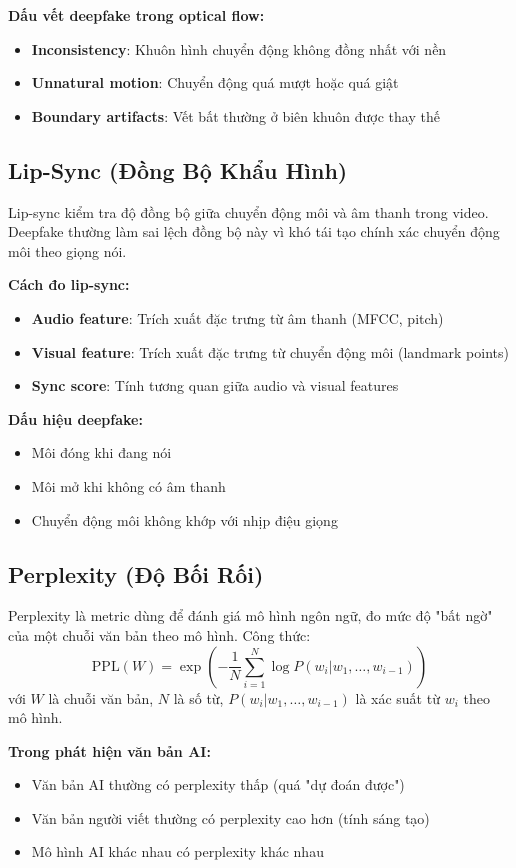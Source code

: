 \textbf{Dấu vết deepfake trong optical flow:}
\begin{itemize}
  \item \textbf{Inconsistency}: Khuôn hình chuyển động không đồng nhất với nền
  \item \textbf{Unnatural motion}: Chuyển động quá mượt hoặc quá giật
  \item \textbf{Boundary artifacts}: Vết bất thường ở biên khuôn được thay thế
\end{itemize}

\subsection{Lip-Sync (Đồng Bộ Khẩu Hình)}
Lip-sync kiểm tra độ đồng bộ giữa chuyển động môi và âm thanh trong video. Deepfake thường làm sai lệch đồng bộ này vì khó tái tạo chính xác chuyển động môi theo giọng nói.

\textbf{Cách đo lip-sync:}
\begin{itemize}
  \item \textbf{Audio feature}: Trích xuất đặc trưng từ âm thanh (MFCC, pitch)
  \item \textbf{Visual feature}: Trích xuất đặc trưng từ chuyển động môi (landmark points)
  \item \textbf{Sync score}: Tính tương quan giữa audio và visual features
\end{itemize}

\textbf{Dấu hiệu deepfake:}
\begin{itemize}
  \item Môi đóng khi đang nói
  \item Môi mở khi không có âm thanh
  \item Chuyển động môi không khớp với nhịp điệu giọng
\end{itemize}

\subsection{Perplexity (Độ Bối Rối)}
Perplexity là metric dùng để đánh giá mô hình ngôn ngữ, đo mức độ "bất ngờ" của một chuỗi văn bản theo mô hình. Công thức:
\[
\text{PPL}(W) = \exp\left(-\frac{1}{N}\sum_{i=1}^{N}\log P(w_i|w_1,\ldots,w_{i-1})\right)
\]
với $W$ là chuỗi văn bản, $N$ là số từ, $P(w_i|w_1,\ldots,w_{i-1})$ là xác suất từ $w_i$ theo mô hình.

\textbf{Trong phát hiện văn bản AI:}
\begin{itemize}
  \item Văn bản AI thường có perplexity thấp (quá "dự đoán được")
  \item Văn bản người viết thường có perplexity cao hơn (tính sáng tạo)
  \item Mô hình AI khác nhau có perplexity khác nhau
\end{itemize}

